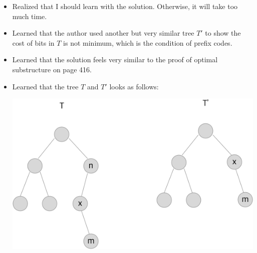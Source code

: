 \documentclass[12pt]{article}
\begin{document}
\begin{enumerate}[1.]
\begin{itemize}
\begin{itemize}
\begin{itemize}
                \bigskip
            \end{itemize}
        \end{itemize}

        \item Realized that I should learn with the solution. Otherwise, it will take too much time.
        \item Learned that the author used another but very similar tree $T'$ to show the cost of
        bits in $T$ is not minimum, which is the condition of prefix codes.
        \item Learned that the solution feels very similar to the proof of optimal
        substructure on page 416.
        \item Learned that the tree $T$ and $T'$ looks as follows:

        \begin{center}
        \includegraphics[width=\linewidth]{images/worksheet_2_solution_12.png}
        \end{center}

    \end{itemize}

\end{enumerate}
\end{document}
